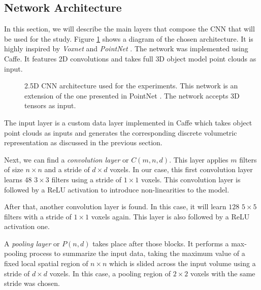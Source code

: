 \subsection{Network Architecture}
\label{cha:objrecog:sec:study:subsec:architecture}

In this section, we will describe the main layers that compose the \ac{CNN} that will be used for the study. Figure \ref{fig:objrecog:cviuarch} shows a diagram of the chosen architecture. It is highly inspired by \emph{Voxnet} \cite{Maturana2015} and \emph{PointNet} \cite{Garcia-Garcia2016}. The network was implemented using Caffe. It features \acs{2D} convolutions and takes full \acs{3D} object model point clouds as input.

\begin{figure}[!b]
	\centering
		\caption{\acs{2.5D} \acl{CNN} architecture used for the experiments. This network is an extension of the one presented in PointNet \cite{Garcia-Garcia2016}. The network accepts \acs{3D} tensors as input.}
	\label{fig:objrecog:cviuarch}
\end{figure}
The input layer is a custom data layer implemented in Caffe which takes object point clouds as inputs and generates the corresponding discrete volumetric representation as discussed in the previous section.

Next, we can find a \emph{convolution layer} or $C(m, n, d)$. This layer applies $m$ filters of size $n\times n$ and a stride of $d\times d$ voxels. In our case, this first convolution layer learns $48$ $3\times3$ filters using a stride of $1\times 1$ voxels. This convolution layer is followed by a \ac{ReLU} activation to introduce non-linearities to the model.

After that, another convolution layer is found. In this case, it will learn $128$ $5\times5$ filters with a stride of $1\times 1$ voxels again. This layer is also followed by a \ac{ReLU} activation one.

A \emph{pooling layer} or $P(n, d)$ takes place after those blocks. It performs a max-pooling process to summarize the input data, taking the maximum value of a fixed local spatial region of $n\times n$ which is slided across the input volume using a stride of $d \times d$ voxels. In this case, a pooling region of $2\times 2$ voxels with the same stride was chosen.

